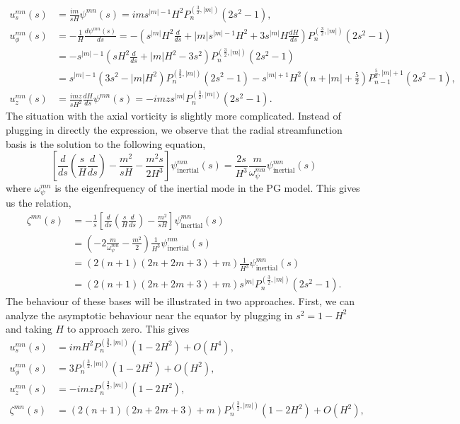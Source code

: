 \begin{equation}
\begin{aligned}
    u_s^{mn}(s) &= \frac{im}{sH} \psi^{mn}(s) = im s^{|m|-1} H^2 P_n^{(\frac{3}{2}, |m|)}(2s^2 - 1), \\ 
    u_\phi^{mn}(s) &= - \frac{1}{H} \frac{d\psi^{mn}(s)}{ds} = - \left(s^{|m|}H^2 \frac{d}{ds} + |m|s^{|m|-1} H^2 + 3s^{|m|}H \frac{dH}{ds}\right) P_n^{(\frac{3}{2},|m|)}(2s^2 - 1) \\ 
    &= -s^{|m|-1} \left(sH^2 \frac{d}{ds} + |m| H^2 - 3s^2\right) P_n^{(\frac{3}{2}, |m|)}(2s^2 -1) \\ 
    &= s^{|m|-1} \left(3s^2 - |m|H^2\right) P_n^{(\frac{3}{2}, |m|)}(2s^2 - 1) - s^{|m|+1}H^2\left(n + |m| + \frac{5}{2}\right) P_{n-1}^{\frac{5}{2},|m|+1}(2s^2 - 1), \\ 
    u_z^{mn}(s) &= \frac{imz}{sH^2} \frac{dH}{ds} \psi^{mn}(s) = - imz s^{|m|} P_n^{(\frac{3}{2}, |m|)}(2s^2 - 1).
\end{aligned}
\end{equation}
The situation with the axial vorticity is slightly more complicated. Instead of plugging in directly the expression, we observe that the radial streamfunction basis is the solution to the following equation,
\[
    \left[\frac{d}{ds} \left(\frac{s}{H} \frac{d}{ds}\right) - \frac{m^2}{sH} - \frac{m^2 s}{2H^3}\right] \psi_\mathrm{inertial}^{mn}(s) = \frac{2s}{H^3} \frac{m}{\omega_\psi^{mn}} \psi_\mathrm{inertial}^{mn}(s)
\]
where $\omega_\psi^{mn}$ is the eigenfrequency of the inertial mode in the PG model. This gives us the relation,
\begin{equation}
\begin{aligned}
    \zeta^{mn}(s) &= -\frac{1}{s} \left[\frac{d}{ds} \left(\frac{s}{H} \frac{d}{ds}\right) - \frac{m^2}{sH}\right] \psi_\mathrm{inertial}^{mn}(s) \\
    &= \left(-2\frac{m}{\omega_\psi^{mn}} - \frac{m^2}{2}\right) \frac{1}{H^3} \psi_\mathrm{inertial}^{mn}(s) \\ 
    &= \left(2(n+1)(2n+2m+3) + m\right) \frac{1}{H^3} \psi_\mathrm{inertial}^{mn}(s) \\ 
    &= \left(2(n+1)(2n+2m+3) + m\right) s^{|m|} P_n^{(\frac{3}{2}, |m|)}(2s^2 - 1).
\end{aligned}
\end{equation}
The behaviour of these bases will be illustrated in two approaches. First, we can analyze the asymptotic behaviour near the equator by plugging in $s^2 = 1-H^2$ and taking $H$ to approach zero. This gives
\[
\begin{aligned}
    u_s^{mn}(s) &= im H^2 P_n^{(\frac{3}{2},|m|)} (1-2H^2) + O(H^4),\\ 
    u_\phi^{mn}(s) &= 3 P_n^{(\frac{3}{2},|m|)} (1-2H^2) + O(H^2),\\
    u_z^{mn}(s) &= -imz P_n^{(\frac{3}{2},|m|)} (1-2H^2),\\
    \zeta^{mn}(s) &= \left(2(n+1)(2n+2m+3) + m\right) P_n^{(\frac{3}{2},|m|)} (1-2H^2) + O(H^2),
\end{aligned}
\]
